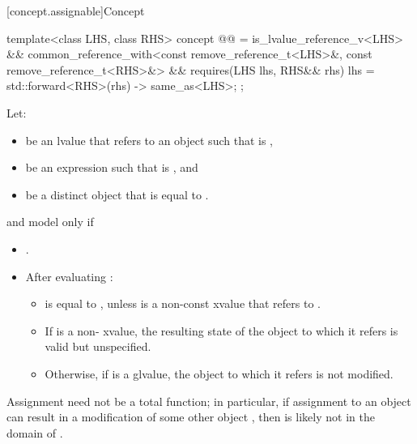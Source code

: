 [concept.assignable]{Concept }

\begin{itemdecl}
template<class LHS, class RHS>
  concept @@ =
    is_lvalue_reference_v<LHS> &&
    common_reference_with<const remove_reference_t<LHS>&, const remove_reference_t<RHS>&> &&
    requires(LHS lhs, RHS&& rhs) {
      { lhs = std::forward<RHS>(rhs) } -> same_as<LHS>;
    };
\end{itemdecl}

\begin{itemdescr}
\pnum
Let:
\begin{itemize}
\item {} be an lvalue that refers to an object  such that
   is ,
\item {} be an expression such that  is
  , and
\item {} be a distinct object that is equal to .
\end{itemize}
 and  model
 only if

\begin{itemize}
\item {}.

\item After evaluating :

\begin{itemize}
\item {} is equal to , unless  is a non-const
xvalue that refers to .

\item If  is a non- xvalue, the resulting state of the
object to which it refers is valid but unspecified.

\item Otherwise, if  is a glvalue, the object to which it refers is
  not modified.
\end{itemize}
\end{itemize}

\pnum
\begin{note}
Assignment need not be a total function;
in particular, if assignment to an object  can result in a modification
of some other object , then  is likely not in the domain
of \tcode{=}.
\end{note}
\end{itemdescr}

